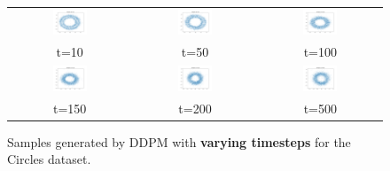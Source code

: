 \documentclass[11pt]{article}
\begin{document}
\begin{figure}[H]
    \centering
    \begin{tabular}{ccc}
        \includegraphics[width=0.3\textwidth]{exps/ddpm_2_10_0.0001_0.02_circles/samples_10.png} &
        \includegraphics[width=0.3\textwidth]{exps/ddpm_2_50_0.0001_0.02_circles/samples_50.png} &
        \includegraphics[width=0.3\textwidth]{exps/ddpm_2_100_0.0001_0.02_circles/samples_100.png} \\
        t=10 & t=50 & t=100 \\[0.5em]
        
        \includegraphics[width=0.3\textwidth]{exps/ddpm_2_150_0.0001_0.02_circles/samples_150.png} &
        \includegraphics[width=0.3\textwidth]{exps/ddpm_2_200_0.0001_0.02_circles/samples_200.png} &
        \includegraphics[width=0.3\textwidth]{exps/ddpm_2_500_0.0001_0.02_circles/samples_500.png} \\
        t=150 & t=200 & t=500 \\
    \end{tabular}
    \caption{Samples generated by DDPM with \textbf{varying timesteps} for the Circles dataset.}
    \label{fig:timesteps_circles}
\end{figure}
\end{document}
